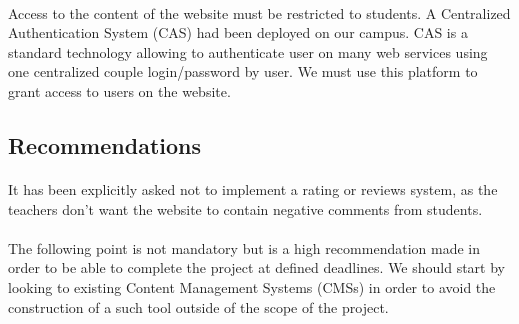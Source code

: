 \paragraph{} Access to the content of the website must be restricted to
students. A Centralized Authentication System (CAS) had been deployed on our
campus. CAS is a standard technology allowing to authenticate user on many
web services using one centralized couple login/password by user. We must use
this platform to grant access to users on the website.

\subsection{Recommendations}

\paragraph{} It has been explicitly asked not to implement a rating or reviews
system, as the teachers don't want the website to contain negative comments from
students.

\paragraph{} The following point is not mandatory but is a high recommendation
made in order to be able to complete the project at defined deadlines. We should
start by looking to existing Content Management Systems (CMSs) in order to avoid
the construction of a such tool outside of the scope of the project.
